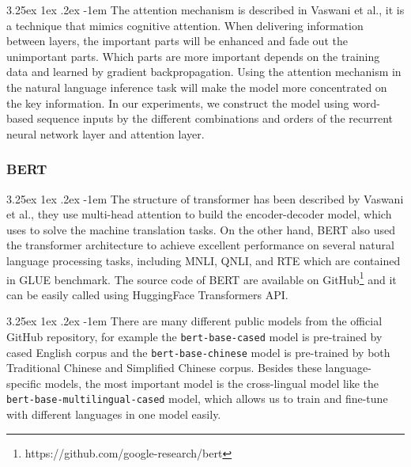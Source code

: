 \documentclass[12pt]{article}
\makeatletter
\renewcommand\paragraph{\@startsection{paragraph}{5}{\z@}%
  {3.25ex \@plus1ex \@minus.2ex}%
  {-1em}%
  {\normalfont\normalsize\bfseries}}
\makeatother
\begin{document}
\begin{CJK*}{UTF8}{bkai}
\begin{spacing}{1.77}


\paragraph{}
The attention mechanism is described in Vaswani et al.\cite{vaswani2017attention}, it is a technique that mimics cognitive attention. When delivering information between layers, the important parts will be enhanced and fade out the unimportant parts. Which parts are more important depends on the training data and learned by gradient backpropagation. Using the attention mechanism in the natural language inference task will make the model more concentrated on the key information. In our experiments, we construct the model using word-based sequence inputs by the different combinations and orders of the recurrent neural network layer and attention layer.

\subsubsection{BERT}
\paragraph{}
The structure of transformer\cite{vaswani2017attention} has been described by Vaswani et al., they use multi-head attention to build the encoder-decoder model, which uses to solve the machine translation tasks. On the other hand, BERT\cite{devlin2018bert} also used the transformer architecture to achieve excellent performance on several natural language processing tasks, including MNLI, QNLI, and RTE which are contained in GLUE benchmark. The source code of BERT are available on GitHub\footnote{https://github.com/google-research/bert} and it can be easily called using HuggingFace Transformers API\cite{wolf-etal-2020-transformers}.

\paragraph{}
There are many different public models from the official GitHub repository, for example the \texttt{bert-base-cased} model is pre-trained by cased English corpus and the \texttt{bert-base-chinese} model is pre-trained by both Traditional Chinese and Simplified Chinese corpus. Besides these language-specific models, the most important model is the cross-lingual model like the \texttt{bert-base-multilingual-cased} model, which allows us to train and fine-tune with different languages in one model easily.


\end{spacing}
\end{CJK*}
\end{document}
